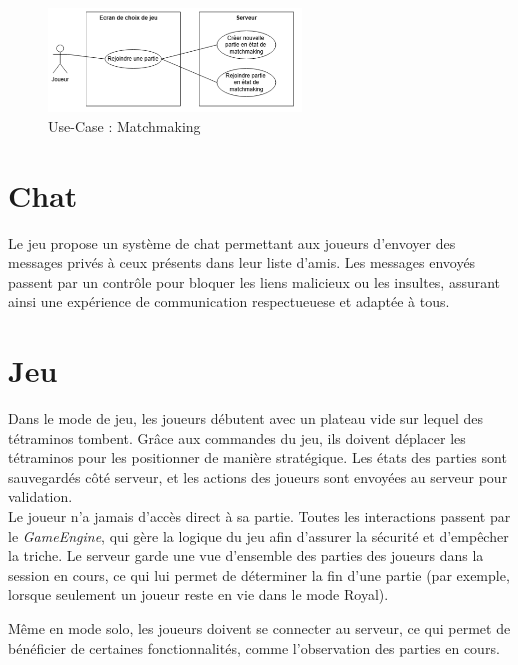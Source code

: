 \documentclass{report}
\begin{document}
\vspace{-1em}

\begin{figure}[H]
    \centering
     \includegraphics[width=0.6\textwidth, keepaspectratio]{src/design/matchmaking.png}
    \caption{Use-Case : Matchmaking}
    \label{fig:use_case_matchmaking}
\end{figure}

\section{Chat}

\noindent Le jeu propose un système de chat permettant aux joueurs d'envoyer des messages privés à ceux présents dans leur liste d'amis. Les messages envoyés passent par un contrôle pour bloquer les liens malicieux ou les insultes, assurant ainsi une expérience de communication respectueuese et adaptée à tous.

\section{Jeu}

\noindent Dans le mode de jeu, les joueurs débutent avec un plateau vide sur lequel des tétraminos tombent. Grâce aux commandes du jeu, ils doivent déplacer les tétraminos pour les positionner de manière stratégique. Les états des parties sont sauvegardés côté serveur, et les actions des joueurs sont envoyées au serveur pour validation. \\

\noindent Le joueur n'a jamais d'accès direct à sa partie. Toutes les interactions passent par le \emph{GameEngine}, qui gère la logique du jeu afin d'assurer la sécurité et d'empêcher la triche. Le serveur garde une vue d'ensemble des parties des joueurs dans la session en cours, ce qui lui permet de déterminer la fin d'une partie (par exemple, lorsque seulement un joueur reste en vie dans le mode Royal).

\noindent Même en mode solo, les joueurs doivent se connecter au serveur, ce qui permet de bénéficier de certaines fonctionnalités, comme l’observation des parties en cours.
\end{document}
